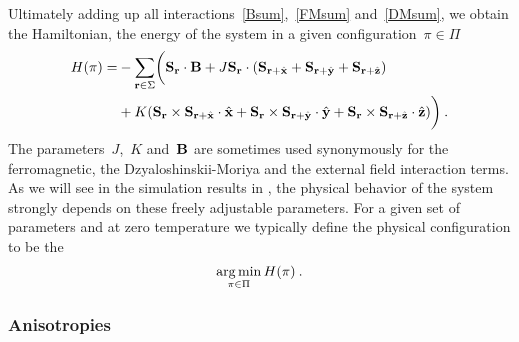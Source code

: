 Ultimately adding up all interactions~\eqref{Bsum},~\eqref{FMsum}
and~\eqref{DMsum}, we obtain the Hamiltonian, \ie{} the energy of the system in
a given configuration~$\pi \in \Pi$
%
\begin{align}\label{hamiltonian}
  H(\pi) = &-\sum_{\mathbf{r} \in \Sigma}\biggl(\mathbf{S}_{\mathbf{r}} \cdot \mathbf{B} +
      J \mathbf{S}_{\mathbf{r}} \cdot (\mathbf{S}_{\mathbf{r}+\hat{\mathbf{x}}} + \mathbf{S}_{\mathbf{r}+\hat{\mathbf{y}}} + \mathbf{S}_{\mathbf{r}+\hat{\mathbf{z}}}) \\
      &+ K (\mathbf{S}_{\mathbf{r}} \times \mathbf{S}_{\mathbf{r}+\hat{\mathbf{x}}} \cdot \hat{\mathbf{x}} +
            \mathbf{S}_{\mathbf{r}} \times \mathbf{S}_{\mathbf{r}+\hat{\mathbf{y}}} \cdot \hat{\mathbf{y}} +
            \mathbf{S}_{\mathbf{r}} \times \mathbf{S}_{\mathbf{r}+\hat{\mathbf{z}}} \cdot \hat{\mathbf{z}})\biggr)\:.
\end{align}
%
The parameters~$J$,~$K$ and~$\mathbf{B}$ are sometimes used synonymously for the
ferromagnetic, the Dzyaloshinskii-Moriya and the external field interaction
terms. As we will see in the simulation results in , the
physical behavior of the system strongly depends on these freely adjustable
parameters. For a given set of parameters and at zero temperature we typically
define the physical configuration to be the
%
\begin{equation}\label{objective}
  \operatorname*{arg\,min}_{\pi \in \Pi} H(\pi)\:.
\end{equation}
%

\subsubsection{Anisotropies}



